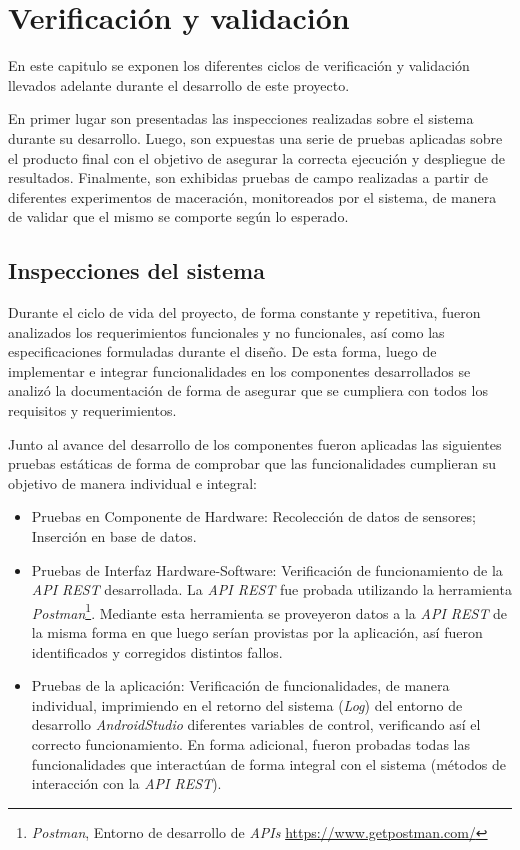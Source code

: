 \chapter{Verificación y validación}
\label{CapituloPruebas}
\par En este capitulo se exponen los diferentes ciclos de verificación y validación llevados adelante durante el desarrollo de este proyecto.
\par En primer lugar son presentadas las inspecciones realizadas sobre el sistema durante su desarrollo. Luego, son expuestas una serie de pruebas aplicadas sobre el producto final con el objetivo de asegurar la correcta ejecución y despliegue de resultados. Finalmente, son exhibidas pruebas de campo realizadas a partir de diferentes experimentos de maceración, monitoreados por el sistema, de manera de validar que el mismo se comporte según lo esperado.

\section{Inspecciones del sistema}

Durante el ciclo de vida del proyecto, de forma constante y repetitiva, fueron analizados los requerimientos funcionales y no funcionales, así como las especificaciones formuladas durante el diseño. De esta forma, luego de implementar e integrar funcionalidades en los componentes desarrollados se analizó la documentación de forma de asegurar que se cumpliera con todos los requisitos y requerimientos.

\par Junto al avance del desarrollo de los componentes fueron aplicadas las siguientes pruebas estáticas de forma de comprobar que las funcionalidades cumplieran su objetivo de manera individual e integral:

\begin{itemize}
    \item Pruebas en Componente de Hardware: Recolección de datos de sensores; Inserción en base de datos.
    \item Pruebas de Interfaz Hardware-Software: Verificación de funcionamiento de la \textit{API REST} desarrollada. La \textit{API REST} fue probada utilizando la herramienta \textit{Postman}\footnote{\textit{Postman}, Entorno de desarrollo de \textit{APIs} \url{https://www.getpostman.com/}}. Mediante esta herramienta se proveyeron datos a la \textit{API REST} de la misma forma en que luego serían provistas por la aplicación, así fueron identificados y corregidos distintos fallos.
    \item Pruebas de la aplicación: Verificación de funcionalidades, de manera individual, imprimiendo en el retorno del sistema (\textit{Log}) del entorno de desarrollo \textit{AndroidStudio} diferentes variables de control, verificando así el correcto funcionamiento. En forma adicional, fueron probadas todas las funcionalidades que interactúan de forma integral con el sistema (métodos de interacción con la \textit{API REST}).
\end{itemize}

